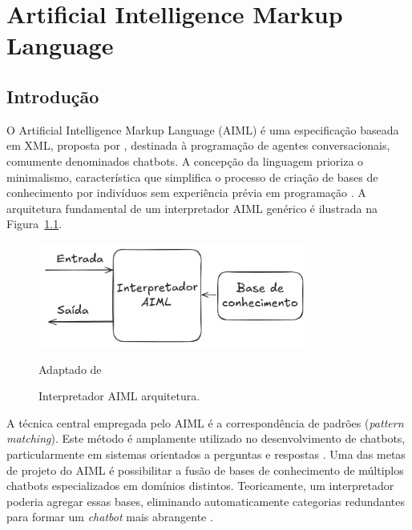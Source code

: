 \documentclass[14pt,a4paper,oneside]{book}
\begin{document}

\chapter{Artificial Intelligence Markup
Language}

\section{Introdução}

O Artificial Intelligence Markup Language (AIML) é uma especificação baseada em XML, proposta por \cite{Wallace2009}, destinada à programação de agentes conversacionais, comumente denominados chatbots. 
A concepção da linguagem prioriza o minimalismo, característica que simplifica o processo de criação de bases de conhecimento por indivíduos sem experiência prévia em programação \cite{Wallace2009}. 
A arquitetura fundamental de um interpretador AIML genérico é ilustrada na Figura~\ref{fig:interpretador}.

\begin{figure}
    \centering
    \caption{Interpretador AIML arquitetura.}
    \includegraphics[width=0.8\textwidth]{./fig/aimlbase.png} 
    \label{fig:interpretador}
    \vspace{0.2cm} 
    {\footnotesize 
	
	Adaptado de \cite{Silva2007}}
\end{figure}

A técnica central empregada pelo AIML é a correspondência de padrões (\emph{pattern matching}). Este método é amplamente utilizado no desenvolvimento de chatbots, particularmente em sistemas orientados a perguntas e respostas \cite{Abdul-Kader2015}.
Uma das metas de projeto do AIML é possibilitar a fusão de bases de conhecimento de múltiplos chatbots especializados em domínios distintos.
Teoricamente, um interpretador poderia agregar essas bases, eliminando automaticamente categorias redundantes para formar um \emph{chatbot} mais abrangente \cite{Wallace2000}.
\end{document}
